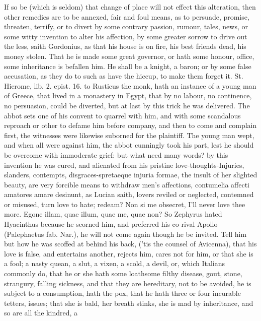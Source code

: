 {If so be (which is seldom) that change of place will not effect this
alteration, then other remedies are to be annexed, fair and foul means,
as to persuade, promise, threaten, terrify, or to divert by some
contrary passion, rumour, tales, news, or some witty invention to alter
his affection, by some greater sorrow to drive out the less,
saith Gordonius, as that his house is on fire, his best friends dead,
his money stolen. That he is made some great governor, or hath
some honour, office, some inheritance is befallen him. He shall be a
knight, a baron; or by some false accusation, as they do to such as
have the hiccup, to make them forget it. St. Hierome, lib. 2. epist.
16. to Rusticus the monk, hath an instance of a young man of Greece,
that lived in a monastery in Egypt, that by no labour, no
continence, no persuasion, could be diverted, but at last by this trick
he was delivered. The abbot sets one of his convent to quarrel with
him, and with some scandalous reproach or other to defame him before
company, and then to come and complain first, the witnesses were
likewise suborned for the plaintiff. The young man wept, and when all
were against him, the abbot cunningly took his part, lest he should be
overcome with immoderate grief: but what need many words? by this
invention he was cured, and alienated from his pristine
love-thoughts-Injuries, slanders, contempts, disgraces-spretaeque
injuria formae, the insult of her slighted beauty, are very forcible
means to withdraw men's affections, contumelia affecti amatores amare
desinunt, as Lucian saith, lovers reviled or neglected, contemned
or misused, turn love to hate; redeam? Non si me obsecret, I'll
never love thee more. Egone illam, quae illum, quae me, quae non? So
Zephyrus hated Hyacinthus because he scorned him, and preferred his
co-rival Apollo (Palephaetus fab. Nar.), he will not come again though
he be invited. Tell him but how he was scoffed at behind his back,
('tis the counsel of Avicenna), that his love is false, and entertains
another, rejects him, cares not for him, or that she is a fool; a nasty
quean, a slut, a vixen, a scold, a devil, or, which Italians commonly
do, that he or she hath some loathsome filthy disease, gout, stone,
strangury, falling sickness, and that they are hereditary, not to be
avoided, he is subject to a consumption, hath the pox, that he hath
three or four incurable tetters, issues; that she is bald, her breath
stinks, she is mad by inheritance, and so are all the kindred, a
}

